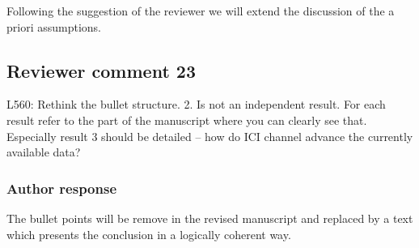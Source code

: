 \documentclass[11pt]{scrartcl}
\begin{document}
Following the suggestion of the reviewer we will extend the discussion
of the a priori assumptions.

%

\subsection*{Reviewer comment 23}
L560:  Rethink the bullet structure.  2.  Is not an independent result.  For each result refer to the part of the manuscript where you can clearly see that.  Especially result 3 should be detailed – how do ICI channel advance the currently available data?

\subsubsection*{Author response}

The bullet points will be remove in the revised manuscript and replaced
by a text which presents the conclusion in a logically coherent way.
\end{document}
